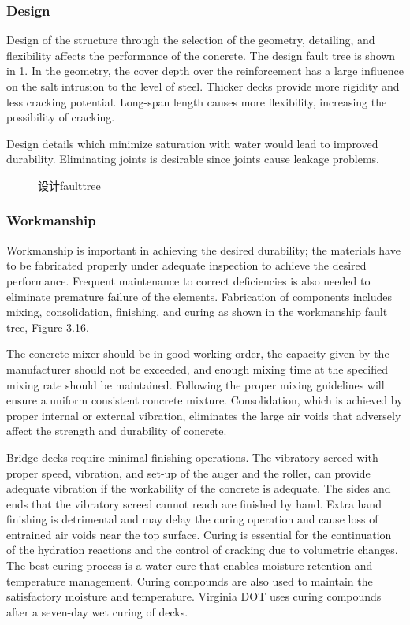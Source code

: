 \subsubsection{Design}
Design of the structure through the selection of the geometry, detailing, and flexibility affects the performance of the concrete. The design fault tree is shown in \cref{fig:faulttree-design}. In the geometry, the cover depth over the reinforcement has a large influence on the salt intrusion to the level of steel. Thicker decks provide more rigidity and less cracking potential. Long-span length causes more flexibility, increasing the possibility of cracking.

Design details which minimize saturation with water would lead to improved durability. Eliminating joints is desirable since joints cause leakage problems.

\begin{figure}
  \caption{设计\gls*{faulttree}}
  \label{fig:faulttree-design}
\end{figure}

\subsubsection{Workmanship}
Workmanship is important in achieving the desired durability; the materials have to be fabricated properly under
adequate inspection to achieve the desired performance. Frequent maintenance to correct deficiencies is also needed
to eliminate premature failure of the elements. Fabrication of components includes mixing, consolidation, finishing,
and curing as shown in the workmanship fault tree, Figure 3.16.

The concrete mixer should be in good working order, the capacity given by the manufacturer should not be
exceeded, and enough mixing time at the specified mixing rate should be maintained. Following the proper mixing
guidelines will ensure a uniform consistent concrete mixture. Consolidation, which is achieved by proper internal or
external vibration, eliminates the large air voids that adversely affect the strength and durability of concrete.

Bridge decks require minimal finishing operations. The vibratory screed with proper speed, vibration, and set-up
of the auger and the roller, can provide adequate vibration if the workability of the concrete is adequate. The sides
and ends that the vibratory screed cannot reach are finished by hand. Extra hand finishing is detrimental and may delay the curing operation and cause loss of entrained air voids near the top surface. Curing is essential for the
continuation of the hydration reactions and the control of cracking due to volumetric changes. The best curing
process is a water cure that enables moisture retention and temperature management. Curing compounds are also
used to maintain the satisfactory moisture and temperature. Virginia DOT uses curing compounds after a seven-day
wet curing of decks.

